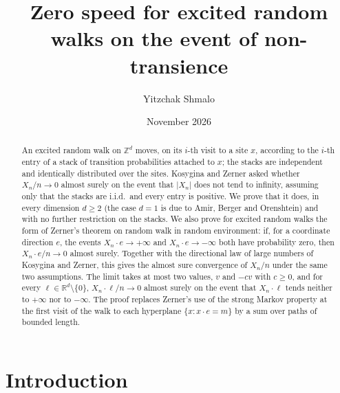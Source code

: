 \documentclass[11pt]{amsart}
\title[Zero speed for excited random walks on the event of non-transience]{Zero speed for excited random walks on the event of non-transience}
\author{Yitzchak Shmalo}
\date{November 2026}
\theoremstyle{remark}
\newcommand{\Z}{\mathbb{Z}}
\newcommand{\R}{\mathbb{R}}
\begin{document}
\begin{abstract}
An excited random walk on $\Z^d$ moves, on its $i$-th visit to a site $x$, according to the $i$-th entry of a stack of
transition probabilities attached to $x$; the stacks are independent and identically distributed over the sites.
Kosygina and Zerner asked whether $X_n/n\to0$ almost surely on the event that $|X_n|$ does not tend to infinity,
assuming only that the stacks are i.i.d.\ and every entry is positive. We prove that it does, in every dimension $d\ge2$ (the case $d=1$ is due to Amir, Berger and
Orenshtein) and with no further restriction on the stacks. We also prove for excited
random walks the form of Zerner's theorem on random walk in random environment: if, for a coordinate
direction $e$, the events $X_n\cdot e\to+\infty$ and $X_n\cdot e\to-\infty$ both have probability zero, then $X_n\cdot e/n\to0$
almost surely. Together with the directional law of large numbers of Kosygina and Zerner, this gives the almost sure
convergence of $X_n/n$ under the same two assumptions. The limit takes at most two values, $v$ and $-cv$ with $c\ge0$,
and for every $\ell\in\R^d\setminus\{0\}$, $X_n\cdot\ell/n\to0$ almost surely on the event that $X_n\cdot\ell$ tends
neither to $+\infty$ nor to $-\infty$. The proof replaces Zerner's use of the strong Markov property at the first visit
of the walk to each hyperplane $\{x:x\cdot e=m\}$ by a sum over paths of bounded length.
\end{abstract}
\maketitle

\section{Introduction}\label{sec:intro}
\end{document}
